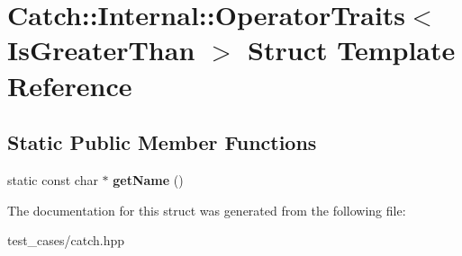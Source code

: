 \hypertarget{structCatch_1_1Internal_1_1OperatorTraits_3_01IsGreaterThan_01_4}{}\section{Catch\+:\+:Internal\+:\+:Operator\+Traits$<$ Is\+Greater\+Than $>$ Struct Template Reference}
\label{structCatch_1_1Internal_1_1OperatorTraits_3_01IsGreaterThan_01_4}
\subsection*{Static Public Member Functions}
\begin{DoxyCompactItemize}
\item 
\mbox{\label{structCatch_1_1Internal_1_1OperatorTraits_3_01IsGreaterThan_01_4_ab917bfb9ccbe461dc684ee5a34d67d27}} 
static const char $\ast$ {\bfseries get\+Name} ()
\end{DoxyCompactItemize}


The documentation for this struct was generated from the following file\+:\begin{DoxyCompactItemize}
\item 
test\+\_\+cases/catch.\+hpp\end{DoxyCompactItemize}
